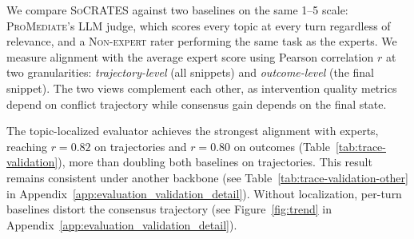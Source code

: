 \documentclass{llmxive}
\providecommand{\algname}{\textsc{SoCRATES}}
\begin{document}
We compare \algname{} against two baselines on the same 1--5 scale: \textsc{ProMediate}'s LLM judge, which scores every topic at every turn regardless of relevance, and a \textsc{Non-expert} rater performing the same task as the experts. We measure alignment with the average expert score using Pearson correlation $r$ at two granularities: \emph{trajectory-level} (all snippets) and \emph{outcome-level} (the final snippet). The two views complement each other, as intervention quality metrics depend on conflict trajectory while consensus gain depends on the final state.

The topic-localized evaluator achieves the strongest alignment with experts, reaching $r = 0.82$ on trajectories and $r = 0.80$ on outcomes (Table~\ref{tab:trace-validation}), more than doubling both baselines on trajectories. This result remains consistent under another backbone (see Table~\ref{tab:trace-validation-other} in Appendix~\ref{app:evaluation_validation_detail}). Without localization, per-turn baselines distort the consensus trajectory (see Figure~\ref{fig:trend} in Appendix~\ref{app:evaluation_validation_detail}).
\end{document}
